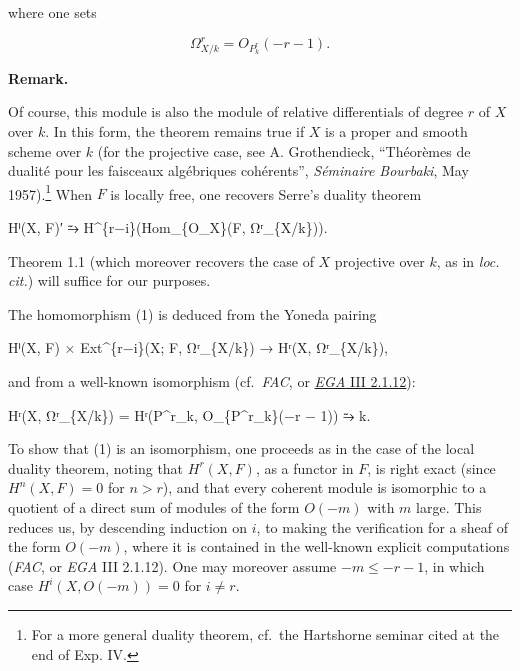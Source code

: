 \documentclass[
  11pt,
  a4paper,
]{book}
\newenvironment{Shaded}{}{}
\newcommand{\NormalTok}[1]{#1}
\begin{document}
where one sets

\[ \Omega^{r}_{X/k} = O_{P^{r}_{k}}(-r - 1). \]

\textbf{Remark.}

Of course, this module is also the module of relative differentials of
degree \(r\) of \(X\) over \(k\). In this form, the theorem remains true
if \(X\) is a proper and smooth scheme over \(k\) (for the projective
case, see A. Grothendieck, ``Théorèmes de dualité pour les faisceaux
algébriques cohérents'', \emph{Séminaire Bourbaki}, May
1957).\footnote{For a more general duality theorem, cf.~the Hartshorne
  seminar cited at the end of Exp. IV.} When \(F\) is locally free, one
recovers Serre's duality theorem

\begin{Shaded}
\begin{Highlighting}[]
\NormalTok{Hⁱ(X, F)′ ⥲ H\^{}\{r−i\}(Hom\_\{O\_X\}(F, Ωʳ\_\{X/k\})).}
\end{Highlighting}
\end{Shaded}

Theorem 1.1 (which moreover recovers the case of \(X\) projective over
\(k\), as in \emph{loc. cit.}) will suffice for our purposes.

The homomorphism (1) is deduced from the Yoneda pairing

\begin{Shaded}
\begin{Highlighting}[]
\NormalTok{Hⁱ(X, F) × Ext\^{}\{r−i\}(X; F, Ωʳ\_\{X/k\}) → Hʳ(X, Ωʳ\_\{X/k\}),}
\end{Highlighting}
\end{Shaded}

and from a well-known isomorphism (cf.~\emph{FAC}, or
\href{https://jcreinhold.github.io/ega/iii/09-ch3-02-cohomology-projective-morphisms.html\#21-explicit-calculations-of-certain-cohomology-groups}{\emph{EGA}
III 2.1.12}):

\begin{Shaded}
\begin{Highlighting}[]
\NormalTok{Hʳ(X, Ωʳ\_\{X/k\}) = Hʳ(P\^{}r\_k, O\_\{P\^{}r\_k\}(−r − 1)) ⥲ k.}
\end{Highlighting}
\end{Shaded}

To show that (1) is an isomorphism, one proceeds as in the case of the
local duality theorem, noting that \(H^{r}(X, F)\), as a functor in
\(F\), is right exact (since \(H^{n}(X, F) = 0\) for \(n > r\)), and
that every coherent module is isomorphic to a quotient of a direct sum
of modules of the form \(O(-m)\) with \(m\) large. This reduces us, by
descending induction on \(i\), to making the verification for a sheaf of
the form \(O(-m)\), where it is contained in the well-known explicit
computations (\emph{FAC}, or \emph{EGA} III 2.1.12). One may moreover
assume \(-m \leqslant -r - 1\), in which case \(H^{i}(X, O(-m))
= 0\) for \(i \neq r\).
\end{document}

